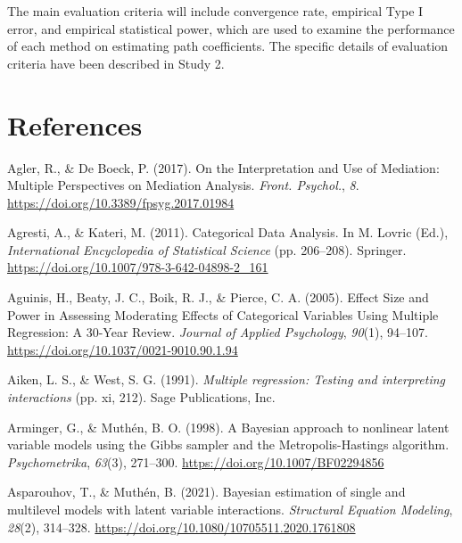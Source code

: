 \documentclass[
  man]{apa6}
\newlength{\cslhangindent}
\newlength{\cslentryspacingunit} %
\newenvironment{CSLReferences}[2] %
 {%
  \setlength{\parindent}{0pt}
  \ifodd #1
  \let\oldpar\par
  \def\par{\hangindent=\cslhangindent\oldpar}
  \fi
  \setlength{\parskip}{#2\cslentryspacingunit}
 }%
 {}
\begin{document}
The main evaluation criteria will include convergence rate, empirical Type I error, and empirical statistical power, which are used to examine the performance of each method on estimating path coefficients. The specific details of evaluation criteria have been described in Study 2.

\newpage

\hypertarget{references}{%
\section{References}\label{references}}

\hypertarget{refs}{}
\begin{CSLReferences}{1}{0}
\leavevmode{}%
Agler, R., \& De Boeck, P. (2017). On the {Interpretation} and {Use} of {Mediation}: {Multiple Perspectives} on {Mediation Analysis}. \emph{Front. Psychol.}, \emph{8}. \url{https://doi.org/10.3389/fpsyg.2017.01984}

\leavevmode{}%
Agresti, A., \& Kateri, M. (2011). Categorical {Data Analysis}. In M. Lovric (Ed.), \emph{International {Encyclopedia} of {Statistical Science}} (pp. 206--208). Springer. \url{https://doi.org/10.1007/978-3-642-04898-2_161}

\leavevmode{}%
Aguinis, H., Beaty, J. C., Boik, R. J., \& Pierce, C. A. (2005). Effect {Size} and {Power} in {Assessing Moderating Effects} of {Categorical Variables Using Multiple Regression}: {A} 30-{Year Review}. \emph{Journal of Applied Psychology}, \emph{90}(1), 94--107. \url{https://doi.org/10.1037/0021-9010.90.1.94}

\leavevmode{}%
Aiken, L. S., \& West, S. G. (1991). \emph{Multiple regression: {Testing} and interpreting interactions} (pp. xi, 212). Sage Publications, Inc.

\leavevmode{}%
Arminger, G., \& Muthén, B. O. (1998). A {Bayesian} approach to nonlinear latent variable models using the {Gibbs} sampler and the {Metropolis-Hastings} algorithm. \emph{Psychometrika}, \emph{63}(3), 271--300. \url{https://doi.org/10.1007/BF02294856}

\leavevmode{}%
Asparouhov, T., \& Muthén, B. (2021). Bayesian estimation of single and multilevel models with latent variable interactions. \emph{Structural Equation Modeling}, \emph{28}(2), 314--328. \url{https://doi.org/10.1080/10705511.2020.1761808}


\end{CSLReferences}
\end{document}
